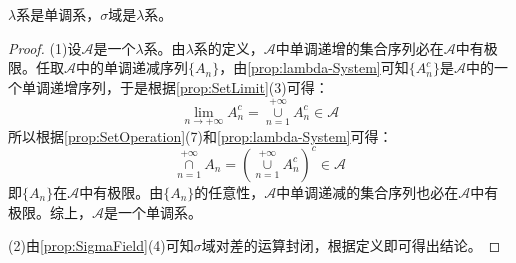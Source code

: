 \begin{theorem}\label{theo:SetNecessarilySet2}
	$\lambda$系是单调系，$\sigma$域是$\lambda$系。
\end{theorem}
\begin{proof}
	(1)设$\mathscr{A}$是一个$\lambda$系。由$\lambda$系的定义，$\mathscr{A}$中单调递增的集合序列必在$\mathscr{A}$中有极限。任取$\mathscr{A}$中的单调递减序列$\{A_n\}$，由\cref{prop:lambda-System}可知$\{A_n^c\}$是$\mathscr{A}$中的一个单调递增序列，于是根据\cref{prop:SetLimit}(3)可得：
	\begin{equation*}
		\lim_{n\to+\infty}A_n^c=\underset{n=1}{\overset{+\infty}{\cup}}A_n^c\in\mathscr{A}
	\end{equation*}
	所以根据\cref{prop:SetOperation}(7)和\cref{prop:lambda-System}可得：
	\begin{equation*}
		\underset{n=1}{\overset{+\infty}{\cap}}A_n=\left(\underset{n=1}{\overset{+\infty}{\cup}}A_n^c\right)^c\in\mathscr{A}
	\end{equation*}
	即$\{A_n\}$在$\mathscr{A}$中有极限。由$\{A_n\}$的任意性，$\mathscr{A}$中单调递减的集合序列也必在$\mathscr{A}$中有极限。综上，$\mathscr{A}$是一个单调系。\par
	(2)由\cref{prop:SigmaField}(4)可知$\sigma$域对差的运算封闭，根据定义即可得出结论。
\end{proof}
